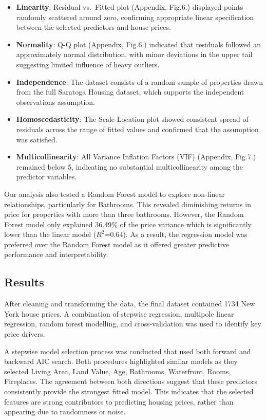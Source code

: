 \documentclass[letterpaper,9pt,twocolumn,twoside,]{pinp}
\providecommand{\tightlist}{%
  \setlength{\itemsep}{0pt}\setlength{\parskip}{0pt}}
\begin{document}
\begin{itemize}
\tightlist
\item
  \textbf{Linearity}: Residual vs.~Fitted plot (Appendix, Fig.6.)
  displayed points randomly scattered around zero, confirming
  appropriate linear specification between the selected predictors and
  house prices.
\item
  \textbf{Normality}: Q-Q plot (Appendix, Fig.6.) indicated that
  residuals followed an approximately normal distribution, with minor
  deviations in the upper tail suggesting limited influence of heavy
  outliers.
\item
  \textbf{Independence}: The dataset consists of a random sample of
  properties drawn from the full Saratoga Housing dataset, which
  supports the independent observations assumption.
\item
  \textbf{Homoscedasticity}: The Scale-Location plot showed consistent
  spread of residuals across the range of fitted values and confirmed
  that the assumption was satisfied.
\item
  \textbf{Multicollinearity}: All Variance Inflation Factors (VIF)
  (Appendix, Fig.7.) remained below 5, indicating no substantial
  multicollinearity among the predictor variables.
\end{itemize}

Our analysis also tested a Random Forest model to explore non-linear
relationships, particularly for Bathrooms. This revealed diminishing
returns in price for properties with more than three bathrooms. However,
the Random Forest model only explained 36.49\% of the price variance
which is significantly lower than the linear model (\(R^2\)=0.64). As a
result, the regression model was preferred over the Random Forest model
as it offered greater predictive performance and interpretability.

\subsection{Results}\label{results}

After cleaning and transforming the data, the final dataset contained
1734 New York house prices. A combination of stepwise regression,
multipole linear regression, random forest modelling, and
cross-validation was used to identify key price drivers.

A stepwise model selection process was conducted that used both forward
and backward AIC search. Both procedures highlighted similar models as
they selected Living Area, Land Value, Age, Bathrooms, Waterfront,
Rooms, Fireplaces. The agreement between both directions suggest that
these predictors consistently provide the strongest fitted model. This
indicates that the selected features are strong contributors to
predicting housing prices, rather than appearing due to randomness or
noise.
\end{document}
